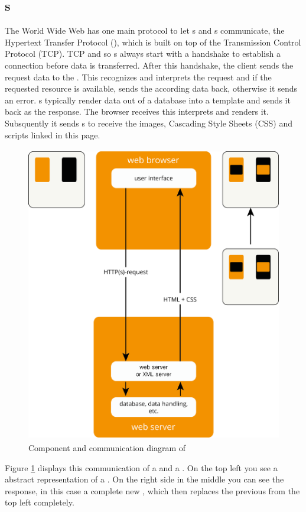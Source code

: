 \subsection{\httpRequest{}s\label{httpRequest}}
The World Wide Web has one main protocol to let \webBrowser{}s and \webServer{}s communicate, the Hypertext Transfer Protocol (\http{}), which is built on top of the Transmission Control Protocol (TCP).
TCP and so \httpRequest{}s always start with a handshake to establish a connection before data is transferred.
After this handshake, the client sends the request data to the \webServer{}.
This recognizes and interprets the request and if the requested resource is available, sends the according data back, otherwise it sends an error.
\WebApplication{}s typically render data out of a database into a \html{} template and sends it back as the response.
The browser receives this \webPage{} interprets and renders it.
Subsquently it sends \httpRequest{}s to receive the images, Cascading Style Sheets (CSS) and scripts linked in this page.
\begin{figure}[H]
\centering
\includegraphics[height=13cm]{images/http.png}
\caption[http_components]{Component and communication diagram of \http{}}
\label{fig:http_components}
\end{figure}

\noindent{}Figure \ref{fig:http_components} displays this communication of a \webBrowser{} and a \webServer{}.
On the top left you see a abstract representation of a \webPage{}.
On the right side in the middle you can see the response, in this case a complete new \webPage{}, which then replaces the previous from the top left completely.


